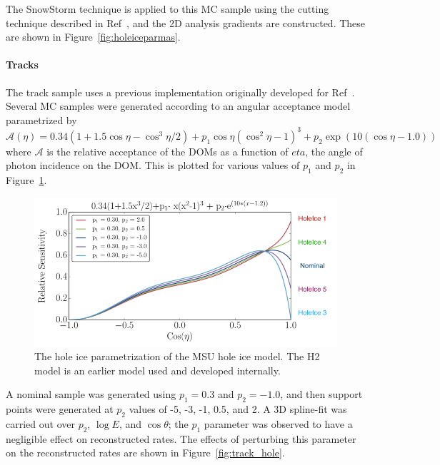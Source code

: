 \documentclass[main.tex]{subfiles}
\begin{document}
The SnowStorm technique is applied to this MC sample using the cutting technique described in Ref~\cite{Aartsen_2019_snow}, and the 2D analysis gradients are constructed. 
These are shown in Figure~\ref{fig:holeiceparmas}. 

\paragraph{Tracks}

The track sample uses a previous implementation originally developed for Ref~\cite{Aartsen_2020_prd}.
Several MC samples were generated according to an angular acceptance model parametrized by 
\begin{equation}
    \mathcal{A}(\eta) = 0.34\left(1+ 1.5\cos\eta - \cos^{3}\eta/2\right) + p_{1}\cos\eta\left(\cos^{2}\eta - 1\right)^{3} + p_{2}\exp\left(10(\cos\eta - 1.0)\right)
\end{equation}
where $\mathcal{A}$ is the relative acceptance of the DOMs as a function of $eta$, the angle of photon incidence on the DOM. 
This is plotted for various values of $p_{1}$ and $p_{2}$ in Figure~\ref{fig:forwardholceice}.

\begin{figure}
    \centering
    \includegraphics[width=0.8\linewidth]{figures/forward_holeice.png}
    \caption{The hole ice parametrization of the MSU hole ice model. The H2 model is an earlier model used and developed internally.}\label{fig:forwardholceice}
\end{figure}

A nominal sample was generated using $p_{1}=0.3$ and $p_{2}=-1.0$, and then support points were generated at $p_{2}$ values of -5, -3, -1, 0.5, and 2.
A 3D spline-fit was carried out over $p_{2}$, $\log E$, and $\cos\theta$; the $p_{1}$ parameter was observed to have a negligible effect on reconstructed rates. 
The effects of perturbing this parameter on the reconstructed rates are shown in Figure~\ref{fig:track_hole}.
\end{document}
